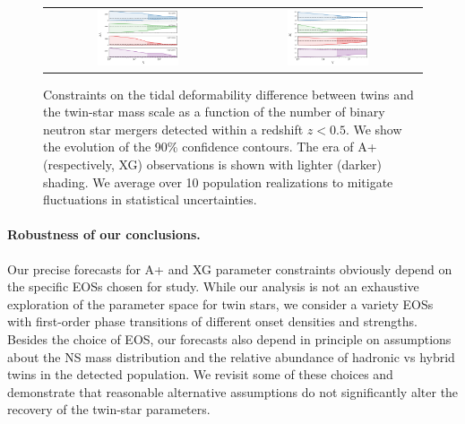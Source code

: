 \documentclass[aps,prl,twocolumn,superscriptaddress,footinbib]{revtex4-1}
\begin{document}
\begin{figure}
    \begin{tabular}{cc}
      \includegraphics[width=0.45\textwidth]{DeltaL_convergence.png}   & \includegraphics[width=0.45\textwidth]{Mt_convergence.png}
    \end{tabular}
    \caption{Constraints on the tidal deformability difference between twins and the twin-star mass scale as a function of the number of binary neutron star mergers detected within a redshift $z < 0.5$. We show the evolution of the 90\% confidence contours. The era of A+ (respectively, XG) observations is shown with lighter (darker) shading. We average over 10 population realizations to mitigate fluctuations in statistical uncertainties.}
    \label{fig:params}
\end{figure}

\paragraph{Robustness of our conclusions.}

Our precise forecasts for A+ and XG parameter constraints obviously depend on the specific EOSs chosen for study. While our analysis is not an exhaustive exploration of the parameter space for twin stars, we consider a variety EOSs with first-order phase transitions of different onset densities and strengths. Besides the choice of EOS, our forecasts also depend in principle on assumptions about the NS mass distribution and the relative abundance of hadronic vs hybrid twins in the detected population. We revisit some of these choices and demonstrate that reasonable alternative assumptions do not significantly alter the recovery of the twin-star parameters.
\end{document}
